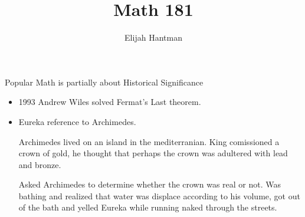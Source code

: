 \documentclass{report}
\title{\Huge{Math 181}}
\author{\huge{Elijah Hantman}}
\date{}
\begin{document}
\maketitle
\newpage

\begin{description}
    \item Popular Math is partially about Historical Significance
        \begin{itemize}
            \item 1993 Andrew Wiles solved Fermat's Last theorem.
            \item Eureka reference to Archimedes.
                \begin{mdframed}
                    Archimedes lived on an island in the
                    mediterranian. King comissioned a crown
                    of gold, he thought that perhaps
                    the crown was adultered with lead and
                    bronze.

                    Asked Archimedes to determine whether the
                    crown was real or not. Was bathing and
                    realized that water was displace according
                    to his volume, got out of the bath and yelled
                    Eureka while running naked through the streets.
                \end{mdframed}
        \end{itemize}


\end{description}
\end{document}
